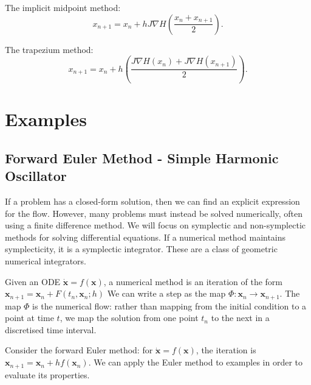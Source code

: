 \documentclass{report}
\theoremstyle{exampstyle} \newtheorem{example}[theorem]{Example}
\theoremstyle{exampstyle} \newtheorem{remark}[theorem]{Remark}
\theoremstyle{exampstyle} \newtheorem{definition}[theorem]{Definition}
\theoremstyle{exampstyle} \newtheorem{lemma}[theorem]{Lemma}
\begin{document}
The implicit midpoint method:
\begin{equation}
	x_{n+1} = x_n + h J \nabla H \left( \frac{x_n + x_{n+1}}{2} \right).
\end{equation}

The trapezium method:
\begin{equation}
	x_{n+1} = x_n + h \left( \frac{J \nabla H(x_n) + J \nabla H(x_{n+1})}{2} \right).
\end{equation}

\section{Examples}
\subsection{Forward Euler Method - Simple Harmonic Oscillator}

If a problem has a closed-form solution, then we can find an explicit expression for the flow.
However, many problems must instead be solved numerically, often using a finite difference method.
We will focus on symplectic and non-symplectic methods for solving differential equations.
If a numerical method maintains symplecticity, it is a symplectic integrator.
These are a class of geometric numerical integrators.

Given an ODE $\dot{\mathbf{x}} = f(\mathbf{x})$, a numerical method is an iteration of the form $\mathbf{x}_{n+1} = \mathbf{x}_n + F(t_n, \mathbf{x}_n; h)$
We can write a step as the map $\Phi: \mathbf{x}_n \rightarrow \mathbf{x}_{n+1}$. The map $\Phi$ is the numerical flow:
rather than mapping from the initial condition to a point at time $t$, we map the solution from one point $t_n$ to the next in a discretised time interval.

Consider the forward Euler method: for $\dot{\mathbf{x}} = f(\mathbf{x})$, the iteration is $\mathbf{x}_{n+1} = \mathbf{x}_n + hf(\mathbf{x}_n)$.
We can apply the Euler method to examples in order to evaluate its properties.
\end{document}
